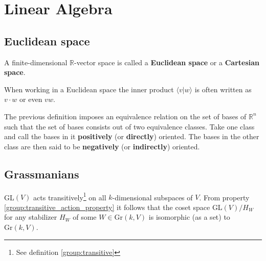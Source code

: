 \chapter{Linear Algebra}\label{chapter:linear_algebra}






\section{Euclidean space}

    A finite-dimensional $\mathbb{R}$-vector space is called a \textbf{Euclidean space} or a \textbf{Cartesian space}.

    \begin{notation}
        When working in a Euclidean space the inner product $\langle v|w\rangle$ is often written as $v\cdot w$ or even $vw$.
    \end{notation}

    \begin{result}
        The previous definition imposes an equivalence relation on the set of bases of $\mathbb{R}^n$ such that the set of bases consists out of two equivalence classes. Take one class and call the bases in it \textbf{positively} (or \textbf{directly}) oriented. The bases in the other class are then said to be \textbf{negatively} (or \textbf{indirectly}) oriented.
    \end{result}

\section{Grassmanians}

    \begin{property}\label{linalgebra:grassmannian_construction}
        GL$(V)$ acts transitively\footnote{See definition \ref{group:transitive}} on all $k$-dimensional subspaces of $V$. From property \ref{group:transitive_action_property} it follows that the coset space GL$(V)/H_W$ for any stabilizer $H_W$ of some $W\in \text{Gr}(k, V)$ is isomorphic (as a set) to $\text{Gr}(k, V)$.
    \end{property}

